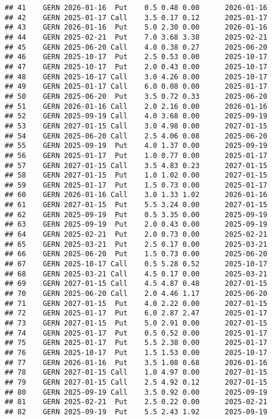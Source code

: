 \documentclass[
]{article}
\begin{document}
\begin{verbatim}
## 41    GERN 2026-01-16  Put    0.5 0.48 0.00      2026-01-16
## 42    GERN 2025-01-17 Call    3.5 0.17 0.12      2025-01-17
## 43    GERN 2026-01-16  Put    5.0 2.30 0.00      2026-01-16
## 44    GERN 2025-02-21  Put    7.0 3.68 3.38      2025-02-21
## 45    GERN 2025-06-20 Call    4.0 0.38 0.27      2025-06-20
## 46    GERN 2025-10-17  Put    2.5 0.53 0.00      2025-10-17
## 47    GERN 2025-10-17  Put    2.0 0.43 0.00      2025-10-17
## 48    GERN 2025-10-17 Call    3.0 4.26 0.00      2025-10-17
## 49    GERN 2025-01-17 Call    6.0 0.08 0.00      2025-01-17
## 50    GERN 2025-06-20  Put    3.5 0.72 0.33      2025-06-20
## 51    GERN 2026-01-16 Call    2.0 2.16 0.00      2026-01-16
## 52    GERN 2025-09-19 Call    4.0 3.68 0.00      2025-09-19
## 53    GERN 2027-01-15 Call    3.0 4.98 0.00      2027-01-15
## 54    GERN 2025-06-20 Call    2.5 4.06 0.08      2025-06-20
## 55    GERN 2025-09-19  Put    4.0 1.37 0.00      2025-09-19
## 56    GERN 2025-01-17  Put    1.0 0.77 0.00      2025-01-17
## 57    GERN 2027-01-15 Call    3.5 4.83 0.23      2027-01-15
## 58    GERN 2027-01-15  Put    1.0 1.02 0.00      2027-01-15
## 59    GERN 2025-01-17  Put    1.5 0.73 0.00      2025-01-17
## 60    GERN 2026-01-16 Call    3.0 1.33 1.02      2026-01-16
## 61    GERN 2027-01-15  Put    5.5 3.24 0.00      2027-01-15
## 62    GERN 2025-09-19  Put    0.5 3.35 0.00      2025-09-19
## 63    GERN 2025-09-19  Put    2.0 0.43 0.00      2025-09-19
## 64    GERN 2025-02-21  Put    2.0 0.73 0.00      2025-02-21
## 65    GERN 2025-03-21  Put    2.5 0.17 0.00      2025-03-21
## 66    GERN 2025-06-20  Put    1.5 0.73 0.00      2025-06-20
## 67    GERN 2025-10-17 Call    0.5 5.28 0.52      2025-10-17
## 68    GERN 2025-03-21 Call    4.5 0.17 0.00      2025-03-21
## 69    GERN 2027-01-15 Call    4.5 4.87 0.48      2027-01-15
## 70    GERN 2025-06-20 Call    2.0 4.46 1.17      2025-06-20
## 71    GERN 2027-01-15  Put    4.0 2.22 0.00      2027-01-15
## 72    GERN 2025-01-17  Put    6.0 2.87 2.47      2025-01-17
## 73    GERN 2027-01-15  Put    5.0 2.91 0.00      2027-01-15
## 74    GERN 2025-01-17  Put    0.5 0.52 0.00      2025-01-17
## 75    GERN 2025-01-17  Put    5.5 2.38 0.00      2025-01-17
## 76    GERN 2025-10-17  Put    1.5 1.53 0.00      2025-10-17
## 77    GERN 2026-01-16  Put    3.5 1.08 0.68      2026-01-16
## 78    GERN 2027-01-15 Call    1.0 4.97 0.00      2027-01-15
## 79    GERN 2027-01-15 Call    2.5 4.92 0.12      2027-01-15
## 80    GERN 2025-09-19 Call    3.5 0.92 0.00      2025-09-19
## 81    GERN 2025-02-21  Put    2.5 0.22 0.00      2025-02-21
## 82    GERN 2025-09-19  Put    5.5 2.43 1.92      2025-09-19

\end{verbatim}
\end{document}
